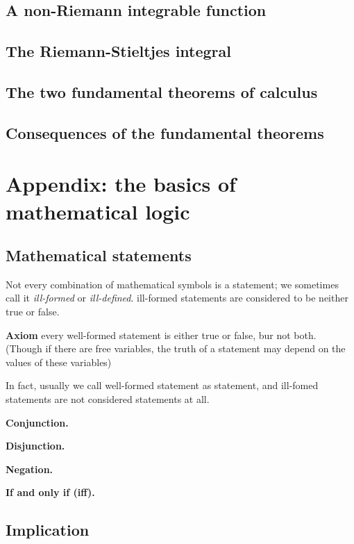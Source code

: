 \documentclass[
]{book}
\theoremstyle{definition}
\theoremstyle{definition}
\theoremstyle{definition}
\theoremstyle{definition}
\theoremstyle{remark}
\begin{document}
\section{A non-Riemann integrable function}\label{a-non-riemann-integrable-function}

\section{The Riemann-Stieltjes integral}\label{the-riemann-stieltjes-integral}

\section{The two fundamental theorems of calculus}\label{the-two-fundamental-theorems-of-calculus}

\section{Consequences of the fundamental theorems}\label{consequences-of-the-fundamental-theorems}

\chapter{Appendix: the basics of mathematical logic}\label{logic}

\section{Mathematical statements}\label{mathematical-statements}

Not every combination of mathematical symbols is a statement; we sometimes call it \emph{ill-formed} or \emph{ill-defined}. ill-formed statements are considered to be neither true or false.

\textbf{Axiom} every well-formed statement is either true or false, bur not both. (Though if there are free variables, the truth of a statement may depend on the values of these variables)

In fact, usually we call well-formed statement as statement, and ill-fomed statements are not considered statements at all.

\textbf{Conjunction.}

\textbf{Disjunction.}

\textbf{Negation.}

\textbf{If and only if (iff).}

\section{Implication}\label{implication}
\end{document}
